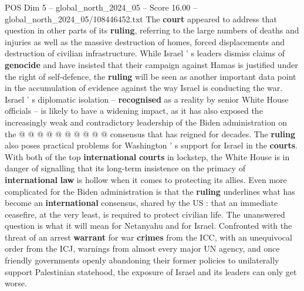 \begin{textsample}{POS Dim 5 – global\_north\_2024\_05 – Score 16.00 – global\_north\_2024\_05/108446452.txt}
The \textbf{court} appeared to address that question in other parts of its \textbf{ruling}, referring to the large numbers of deaths and injuries as well as the massive destruction of homes, forced displacements and destruction of civilian infrastructure.
While Israel ' s leaders dismiss claims of \textbf{genocide} and have insisted that their campaign against Hamas is justified under the right of self-defence, the \textbf{ruling} will be seen as another important data point in the accumulation of evidence against the way Israel is conducting the war.
Israel ' s diplomatic isolation -- \textbf{recognised} as a reality by senior White House officials -- is likely to have a widening impact, as it has also exposed the increasingly weak and contradictory leadership of the Biden administration on the @ @ @ @ @ @ @ @ @ @ consensus that has reigned for decades.
The \textbf{ruling} also poses practical problems for Washington ' s support for Israel in the \textbf{courts}.
With both of the top \textbf{international} \textbf{courts} in lockstep, the White House is in danger of signalling that its long-term insistence on the primacy of \textbf{international} \textbf{law} is hollow when it comes to protecting its allies.
Even more complicated for the Biden administration is that the \textbf{ruling} underlines what has become an \textbf{international} consensus, shared by the US : that an immediate ceasefire, at the very least, is required to protect civilian life.
The unanswered question is what it will mean for Netanyahu and for Israel.
Confronted with the threat of an arrest \textbf{warrant} for war \textbf{crimes} from the ICC, with an unequivocal order from the ICJ, warnings from almost every major UN agency, and once friendly governments openly abandoning their former policies to unilaterally support Palestinian statehood, the exposure of Israel and its leaders can only get worse.

\end{textsample}
